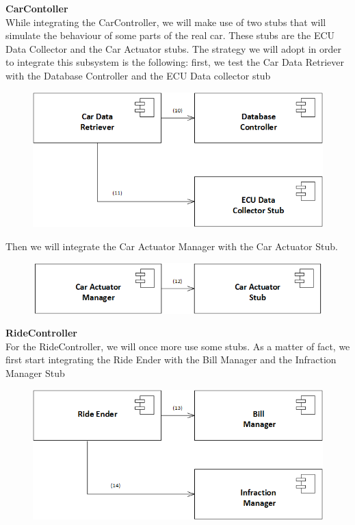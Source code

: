 \documentclass{article}
\begin{document}
\textbf{CarContoller}
\\
While integrating the CarController, we will make use of two stubs that will simulate the behaviour of some parts of the real car. These stubs are the ECU Data Collector and the Car Actuator stubs. The strategy we will adopt in order to integrate this subsystem is the following: first, we test the Car Data Retriever with the Database Controller and the ECU Data collector stub
\begin{figure}[H]
\includegraphics[scale=0.5]{CarController/CarController1}
\centering
\end{figure}
Then we will integrate the Car Actuator Manager with the Car Actuator Stub.
\begin{figure}[H]
\includegraphics[scale=0.5]{CarController/CarController2}
\centering
\end{figure}
\textbf{RideController}
\\
For the RideController, we will once more use some stubs. As a matter of fact, we first start integrating the Ride Ender with the Bill Manager and the Infraction Manager Stub
\begin{figure}[H]
\includegraphics[scale=0.5]{RideController/RideController1}
\centering
\end{figure}
\end{document}
